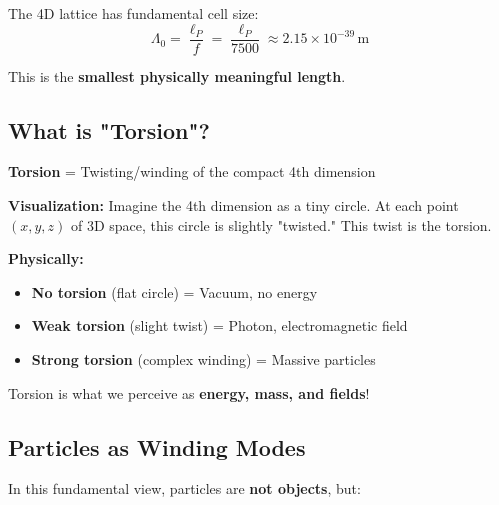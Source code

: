 	The 4D lattice has fundamental cell size:
	\begin{equation}
		\Lambda_0 = \frac{\ell_P}{f} = \frac{\ell_P}{7500} \approx 2.15 \times 10^{-39}\,\text{m}
	\end{equation}
	
	This is the \textbf{smallest physically meaningful length}.
	
	\subsection{What is "Torsion"?}
	
	\begin{philosophical}
		\textbf{Torsion} = Twisting/winding of the compact 4th dimension
		
		\vspace{0.3cm}
		
		\textbf{Visualization:}
		Imagine the 4th dimension as a tiny circle. At each point $(x,y,z)$ of 3D space, this circle is slightly "twisted." This twist is the torsion.
		
		\vspace{0.3cm}
		
		\textbf{Physically:}
		\begin{itemize}
			\item \textbf{No torsion} (flat circle) = Vacuum, no energy
			\item \textbf{Weak torsion} (slight twist) = Photon, electromagnetic field
			\item \textbf{Strong torsion} (complex winding) = Massive particles
		\end{itemize}
		
		Torsion is what we perceive as \textbf{energy, mass, and fields}!
	\end{philosophical}
	
	\subsection{Particles as Winding Modes}
	
	In this fundamental view, particles are \textbf{not objects}, but:
	
